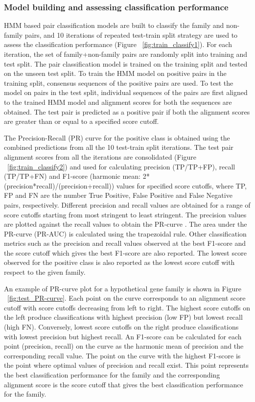 \documentclass{article}
\begin{document}
			\subsubsection{Model building and assessing classification performance}
			HMM based pair classification models are built to classify the family and non-family pairs, and 10 iterations of repeated test-train split strategy are used to assess the classification performance (Figure ~\ref{fig:train_classify1}). For each iteration, the set of family+non-family pairs are randomly split into training and test split. The pair classification model is trained on the training split and tested on the unseen test split. To train the HMM model on positive pairs in the training split, consensus sequences of the positive pairs are used. To test the model on pairs in the test split, individual sequences of the pairs are first aligned to the trained HMM model and alignment scores for both the sequences are obtained. The test pair is predicted as a positive pair if both the alignment scores are greater than or equal to a specified score cutoff.
			
			The Precision-Recall (PR) curve for the positive class is obtained using the combined predictions from all the 10 test-train split iterations. The test pair alignment scores from all the iterations are consolidated (Figure ~\ref{fig:train_classify2}) and used for calculating precision (TP/TP+FP), recall (TP/TP+FN) and F1-score (harmonic mean: 2*(precision*recall)/(precision+recall)) values for specified score cutoffs, where TP, FP and FN are the number True Positive, False Positive and False Negative pairs, respectively. Different precision and recall values are obtained for a range of score cutoffs starting from most stringent to least stringent. The precision values are plotted against the recall values to obtain the PR-curve \citep{davis2006relationship}. The area under the PR-curve (PR-AUC) is calculated using the trapezoidal rule. Other classification metrics such as the precision and recall values observed at the best F1-score and the score cutoff which gives the best F1-score are also reported. The lowest score observed for the positive class is also reported as the lowest score cutoff with respect to the given family. 
			
			An example of PR-curve plot for a hypothetical gene family is shown in Figure ~\ref{fig:test_PR-curve}. Each point on the curve corresponds to an alignment score cutoff with score cutoffs decreasing from left to right. The highest score cutoffs on the left produce classifications with highest precision (low FP) but lowest recall (high FN). Conversely, lowest score cutoffs on the right produce classifications with lowest precision but highest recall. An F1-score can be calculated for each point (precision, recall) on the curve as the harmonic mean of precision and the corresponding recall value. The point on the curve with the highest F1-score is the point where optimal values of precision and recall exist. This point represents the best classification performance for the family and the corresponding alignment score is the score cutoff that gives the best classification performance for the family.
			
\end{document}
